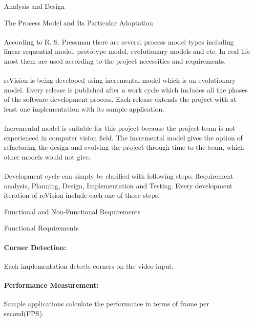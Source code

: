 \documentclass[12pt, a4paper]{article} \pagenumbering{gobble}
\begin{document}
\begin{section}{Analysis and Design}
  \begin{subsection}{The Process Model and Its Particular Adaptation}
    \paragraph{}{According to R. S. Pressman \cite{pressman} there are several process model types including linear sequential model, prototype model, evolutionary models and etc.
    In real life most them are used according to the project necessities and requirements.}
    \paragraph{}{reVision is being developed using incremental model which is an evolutionary model.
    Every release is published after a work cycle which includes all the phases of the software development process.
    Each release extends the project with at least one implementation with its sample application.}
    \paragraph{}{Incremental model is suitable for this project because the project team is not experienced in
    computer vision field. The incremental model gives the option of refactoring the design and evolving the project
    through time to the team, which other models would not give.}
    \paragraph{}{Development cycle can simply be clarified with following steps; Requirement analysis, Planning, Design,
    Implementation and Testing. Every development iteration of reVision include each one of those steps.}
  \end{subsection}
  \newpage
  \begin{subsection}{Functional and Non-Functional Requirements}
    \begin{subsubsection}{Functional Requirements}
      \paragraph{Corner Detection:}{
        Each implementation detects corners on the video input.
      }
      \paragraph{Performance Measurement:}{
        Sample applications calculate the performance in terms of frame per second(FPS).
      }


\end{subsubsection}
\end{subsection}
\end{section}
\end{document}
